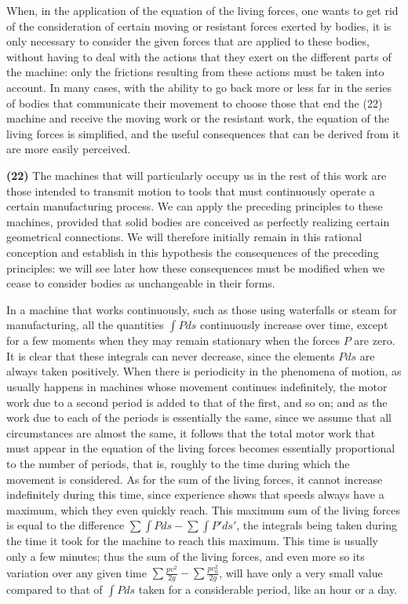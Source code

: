 \documentclass{book}
\begin{document}
When, in the application of the equation of the living forces, one wants to get rid of the consideration of certain moving or resistant forces exerted by bodies, it is only necessary to consider the given forces that are applied to these bodies, without having to deal with the actions that they exert on the different parts of the machine: only the frictions resulting from these actions must be taken into account. In many cases, with the ability to go back more or less far in the series of bodies that communicate their movement to choose those that end the 
\newpage
(22)\\
machine and receive the moving work or the resistant work, the equation of the living forces is simplified, and the useful consequences that can be derived from it are more easily perceived.

\textbf{(22)} The machines that will particularly occupy us in the rest of this work are those intended to transmit motion to tools that must continuously operate a certain manufacturing process. We can apply the preceding principles to these machines, provided that solid bodies are conceived as perfectly realizing certain geometrical connections. We will therefore initially remain in this rational conception and establish in this hypothesis the consequences of the preceding principles: we will see later how these consequences must be modified when we cease to consider bodies as unchangeable in their forms.

In a machine that works continuously, such as those using waterfalls or steam for manufacturing, all the quantities \(\int Pds\) continuously increase over time, except for a few moments when they may remain stationary when the forces \(P\) are zero. It is clear that these integrals can never decrease, since the elements \(Pds\) are always taken positively. When there is periodicity in the phenomena of motion, as usually happens in machines whose movement continues indefinitely, the motor work due to a second period is added to that of the first, and so on; and as the work due to each of the periods is essentially the same, since we assume that all circumstances are almost the same, it follows that the total motor work that must appear in the equation of the living forces becomes essentially proportional to the number of periods, that is, roughly to the time during which the movement is considered. As for the sum of the living forces, it cannot increase indefinitely during this time, since experience shows that speeds always have a maximum, which they even quickly reach. This maximum sum of the living forces is equal to the difference \(\sum \int Pds - \sum \int P'ds'\), the integrals being taken during the time it took for the machine to reach this maximum. This time is usually only a few minutes; thus the sum of the living forces, and even more so its variation over any given time \(\sum \frac{pv^2}{2g} - \sum \frac{pv_0^2}{2g}\), will have only a very small value compared to that of \(\int Pds\) taken for a considerable period, like an hour or a day.
\end{document}

